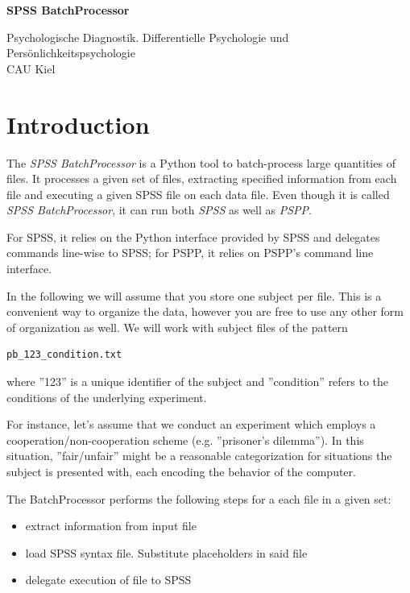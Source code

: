 \documentclass[]{article}
\begin{document}
	\begin{titlepage}
		\centering
		\vspace*{\fill}
		
		\vspace*{0.5cm}
		
		\huge\bfseries
		SPSS BatchProcessor
		
		\vspace*{0.5cm}

		\small
		Psychologische Diagnostik. Differentielle Psychologie und Persönlichkeitspsychologie\\
		CAU Kiel
		
		\vspace*{\fill}
	\end{titlepage}
	
	

\tableofcontents

\section{Introduction}

The \textit{SPSS BatchProcessor} is a Python tool to batch-process large quantities of files. It processes a given set of files, extracting specified information from each file and executing a given SPSS file on each data file.
Even though it is called \textit{SPSS BatchProcessor}, it can run both \textit{SPSS} as well as \textit{PSPP}.  

For SPSS, it relies on the Python interface provided by SPSS and delegates commands line-wise to SPSS; for PSPP, it relies on PSPP's command line interface.

In the following we will assume that you store one subject per file. This is a convenient way to organize the data, however you are free to use any other form of organization as well. We will work with subject files of the pattern
\begin{verbatim}
pb_123_condition.txt
\end{verbatim}
where ''123'' is a unique identifier of the subject and ''condition'' refers to the conditions of the underlying experiment. 

For instance, let's assume that we conduct an experiment which employs a cooperation/non-cooperation scheme (e.g. ''prisoner's dilemma''). In this situation, ''fair/unfair'' might be a reasonable categorization for situations the subject is presented with, each encoding the behavior of the computer. 

The BatchProcessor performs the following steps for a each file in a given set:
\begin{itemize}[noitemsep]
	\item extract information from input file
	\item load SPSS syntax file. Substitute placeholders in said file
	\item delegate execution of file to SPSS
\end{itemize}
\end{document}
